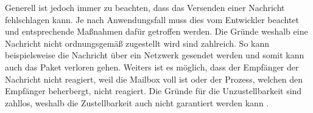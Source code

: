 Generell ist jedoch immer zu beachten, dass das Versenden einer Nachricht fehlschlagen kann. Je nach Anwendungsfall muss dies vom Entwickler beachtet und entsprechende Maßnahmen dafür getroffen werden. Die Gründe weshalb eine Nachricht nicht ordnungsgemäß zugestellt wird sind zahlreich. So kann beispielsweise die Nachricht über ein Netzwerk gesendet werden und somit kann auch das Paket verloren gehen. Weiters ist es möglich, dass der Empfänger der Nachricht nicht reagiert, weil die Mailbox voll ist oder der Prozess, welchen den Empfänger beherbergt, nicht reagiert. Die Gründe für die Unzustellbarkeit sind zahllos, weshalb die Zustellbarkeit auch nicht garantiert werden kann \citep{messagedeliveryreliabilityakkadocumentation}.







 